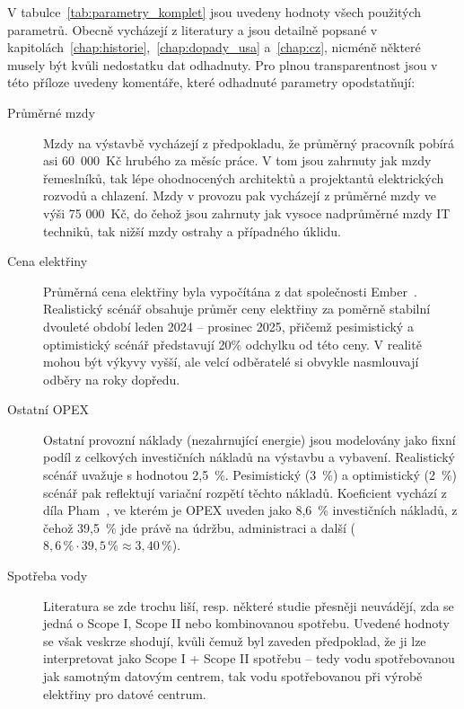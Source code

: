V tabulce~\ref{tab:parametry_komplet} jsou uvedeny hodnoty všech použitých parametrů. Obecně vycházejí z literatury a jsou detailně popsané v kapitolách~\ref{chap:historie},~\ref{chap:dopady_usa} a~\ref{chap:cz}, nicméně některé musely být kvůli nedostatku dat odhadnuty. Pro plnou transparentnost jsou v této příloze uvedeny komentáře, které odhadnuté parametry opodstatňují:

\begin{description}
    
    \item[Průměrné mzdy] Mzdy na výstavbě vycházejí z předpokladu, že průměrný pracovník pobírá asi 60~000~Kč hrubého za měsíc práce. V tom jsou zahrnuty jak mzdy řemeslníků, tak lépe ohodnocených architektů a projektantů elektrických rozvodů a chlazení. Mzdy v provozu pak vycházejí z průměrné mzdy ve výši 75 000~Kč, do čehož jsou zahrnuty jak vysoce nadprůměrné mzdy IT techniků, tak nižší mzdy ostrahy a případného úklidu.

    \item[Cena elektřiny] Průměrná cena elektřiny byla vypočítána z dat společnosti Ember~\cite{ember_average_2026}. Realistický scénář obsahuje průměr ceny elektřiny za poměrně stabilní dvouleté období leden 2024 -- prosinec 2025, přičemž pesimistický a optimistický scénář představují 20\% odchylku od této ceny. V realitě mohou být výkyvy vyšší, ale velcí odběratelé si obvykle nasmlouvají odběry na roky dopředu.

    \item[Ostatní OPEX] Ostatní provozní náklady (nezahrnující energie) jsou modelovány jako fixní podíl z celkových investičních nákladů na výstavbu a vybavení. Realistický scénář uvažuje s hodnotou 2,5~\%. Pesimistický (3~\%) a optimistický (2~\%) scénář pak reflektují variační rozpětí těchto nákladů. Koeficient vychází z díla Pham~\cite{pham_data_2017}, ve kterém je OPEX uveden jako 8,6~\% investičních nákladů, z čehož 39,5~\% jde právě na údržbu, administraci a další ($8{,}6\,\% \cdot 39{,}5\,\% \approx 3{,}40\,\%$). 

    \item[Spotřeba vody] Literatura se zde trochu liší, resp. některé studie přesněji neuvádějí, zda se jedná o Scope I, Scope II nebo kombinovanou spotřebu. Uvedené hodnoty se však veskrze shodují, kvůli čemuž byl zaveden předpoklad, že ji lze interpretovat jako Scope I + Scope II spotřebu -- tedy vodu spotřebovanou jak samotným datovým centrem, tak vodu spotřebovanou při výrobě elektřiny pro datové centrum. 


\end{description}
